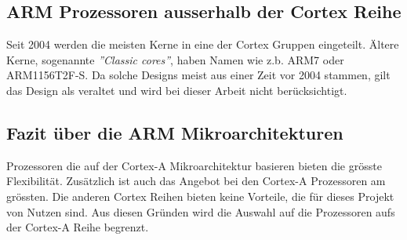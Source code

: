 \subsection{ARM Prozessoren ausserhalb der Cortex Reihe}
Seit 2004 werden die meisten Kerne in eine der Cortex Gruppen eingeteilt.
Ältere Kerne, sogenannte \textit{''Classic cores''}, haben Namen wie z.b. ARM7 oder ARM1156T2F-S.
Da solche Designs meist aus einer Zeit vor 2004 stammen, gilt das Design als veraltet und wird bei dieser Arbeit nicht berücksichtigt.

\subsection{Fazit über die ARM Mikroarchitekturen}
Prozessoren die auf der Cortex-A Mikroarchitektur basieren bieten die grösste Flexibilität.
Zusätzlich ist auch das Angebot bei den Cortex-A Prozessoren am grössten.
Die anderen Cortex Reihen bieten keine Vorteile, die für dieses Projekt von Nutzen sind.
Aus diesen Gründen wird die Auswahl auf die Prozessoren aufs der Cortex-A Reihe begrenzt.

